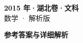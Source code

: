 \documentclass[zihao=-4, a4paper]{ctexart}
\begin{document}
\begin{center}
  {\Large\bfseries 2015 年·湖北卷·文科}\\[4pt]
  {\large 数学 · 解析版}
\end{center}
\medskip
{}

\clearpage
{}
\begin{center}{\Large\bfseries 参考答案与详细解析}\end{center}
\medskip

\end{document}
